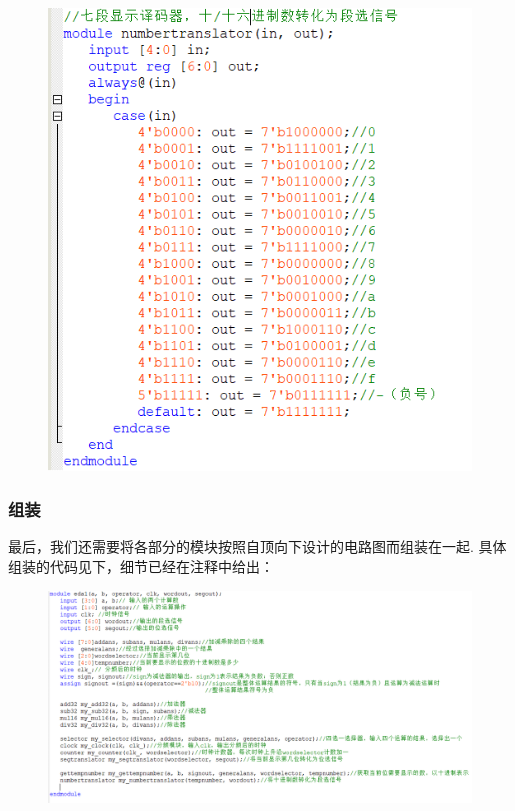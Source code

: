 \documentclass[UTF8]{ctexart}
\begin{document}
\begin{figure}[H]\begin{center}
    \includegraphics[scale=1]{numbertranslator.PNG}
\end{center}\end{figure}

\subsubsection{组装}
最后，我们还需要将各部分的模块按照自顶向下设计的电路图而组装在一起. 具体组装的代码见下，细节已经在注释中给出：
\begin{figure}[H]\begin{center}
    \includegraphics[scale=0.65]{main.PNG}
\end{center}\end{figure}
\end{document}
